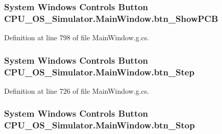 \subsubsection[{btn\+\_\+\+Show\+P\+C\+B}]{\setlength{\rightskip}{0pt plus 5cm}System Windows Controls Button C\+P\+U\+\_\+\+O\+S\+\_\+\+Simulator.\+Main\+Window.\+btn\+\_\+\+Show\+P\+C\+B\hspace{0.3cm}{\ttfamily [package]}}\label{class_c_p_u___o_s___simulator_1_1_main_window_a967a1b3dbde7ecb1d8091e5eababcc58}


Definition at line 798 of file Main\+Window.\+g.\+cs.

\hypertarget{class_c_p_u___o_s___simulator_1_1_main_window_acd572aa9d278af703febb634fc1c34a3}{}
\subsubsection[{btn\+\_\+\+Step}]{\setlength{\rightskip}{0pt plus 5cm}System Windows Controls Button C\+P\+U\+\_\+\+O\+S\+\_\+\+Simulator.\+Main\+Window.\+btn\+\_\+\+Step\hspace{0.3cm}{\ttfamily [package]}}\label{class_c_p_u___o_s___simulator_1_1_main_window_acd572aa9d278af703febb634fc1c34a3}


Definition at line 726 of file Main\+Window.\+g.\+cs.

\hypertarget{class_c_p_u___o_s___simulator_1_1_main_window_a1b6b541d9765ca230f537d1d6b6c83aa}{}
\subsubsection[{btn\+\_\+\+Stop}]{\setlength{\rightskip}{0pt plus 5cm}System Windows Controls Button C\+P\+U\+\_\+\+O\+S\+\_\+\+Simulator.\+Main\+Window.\+btn\+\_\+\+Stop\hspace{0.3cm}{\ttfamily [package]}}\label{class_c_p_u___o_s___simulator_1_1_main_window_a1b6b541d9765ca230f537d1d6b6c83aa}


